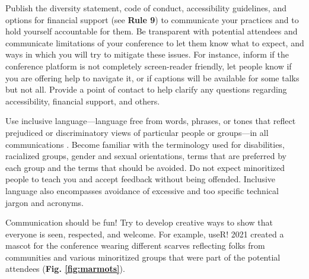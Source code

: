 \documentclass[10pt,letterpaper]{article}
\begin{document}
Publish the diversity statement, code of conduct, accessibility guidelines, and options for financial support (see \textbf{Rule 9}) to communicate your practices and to hold yourself accountable for them.
Be transparent with potential attendees and communicate limitations of your conference to let them know what to expect, and ways in which you will try to mitigate these issues. 
For instance, inform if the conference platform is not completely screen-reader friendly, let people know if you are offering help to navigate it, or if captions will be available for some talks but not all.
Provide a point of contact to help clarify any questions regarding accessibility, financial support, and others.

Use inclusive language—language free from words, phrases, or tones that reflect prejudiced or discriminatory views of particular people or groups—in all communications \cite{hallDesigningDiversityInclusion2019}. 
Become familiar with the terminology used for disabilities, racialized groups, gender and sexual orientations, terms that are preferred by each group and the terms that should be avoided.
Do not expect minoritized people to teach you and accept feedback without being offended.
Inclusive language also encompasses avoidance of excessive and too specific technical jargon and acronyms. 

Communication should be fun! Try to develop creative ways to show that everyone is seen, respected, and welcome. 
For example, useR! 2021 created a mascot for the conference wearing different scarves reflecting folks from communities and various minoritized groups that were part of the potential attendees (\textbf{Fig. \ref{fig:marmots}}). 
\end{document}
